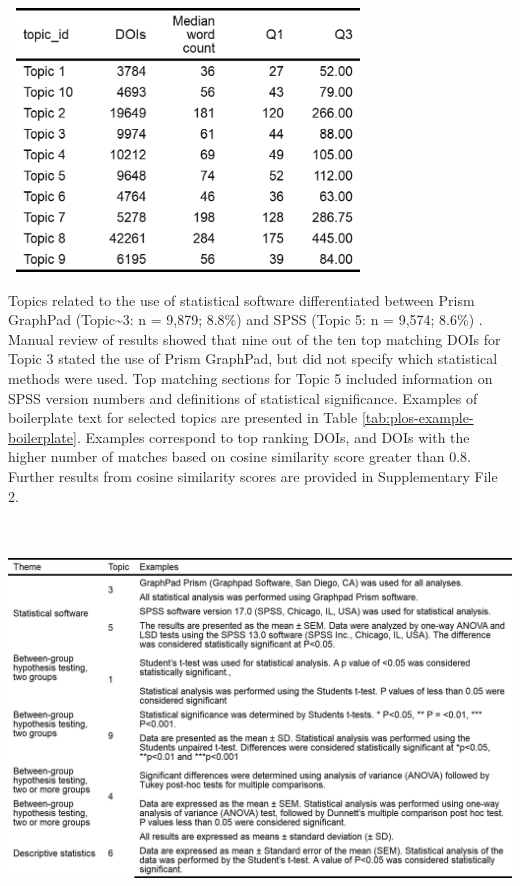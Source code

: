 \documentclass[12pt]{article}
\begin{document}
\includegraphics[width=3.75in,height=2.75in,keepaspectratio]{asa_template_files/figure-latex/unnamed-chunk-6-1.png}

Topics related to the use of statistical software differentiated between
Prism GraphPad (Topic\textasciitilde3: n = 9,879; 8.8\%) and SPSS (Topic
5: n = 9,574; 8.6\%) . Manual review of results showed that nine out of
the ten top matching DOIs for Topic 3 stated the use of Prism GraphPad,
but did not specify which statistical methods were used. Top matching
sections for Topic 5 included information on SPSS version numbers and
definitions of statistical significance. Examples of boilerplate text
for selected topics are presented in Table
\ref{tab:plos-example-boilerplate}. Examples correspond to top ranking
DOIs, and DOIs with the higher number of matches based on cosine
similarity score greater than 0.8. Further results from cosine
similarity scores are provided in Supplementary File 2.

\includegraphics[width=8.00in,height=4.12in,keepaspectratio]{asa_template_files/figure-latex/unnamed-chunk-7-1.png}
\end{document}
